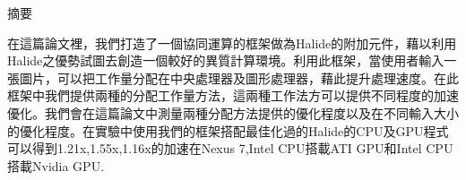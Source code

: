 \begin{abstractzh}
摘要

在這篇論文裡，我們打造了一個協同運算的框架做為Halide的附加元件，藉以利用Halide之優勢試圖去創造一個較好的異質計算環境。利用此框架，當使用者輸入一張圖片，可以把工作量分配在中央處理器及圖形處理器，藉此提升處理速度。在此框架中我們提供兩種的分配工作量方法，這兩種工作法方可以提供不同程度的加速優化。我們會在這篇論文中測量兩種分配方法提供的優化程度以及在不同輸入大小的優化程度。在實驗中使用我們的框架搭配最佳化過的Halide的CPU及GPU程式可以得到1.21x,1.55x,1.16x的加速在Nexus 7,Intel CPU搭載ATI GPU和Intel CPU搭載Nvidia GPU.
\end{abstractzh}
